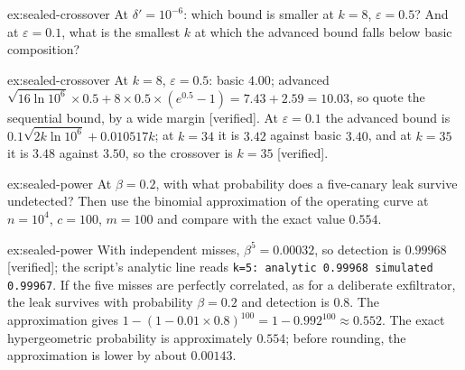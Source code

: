 \documentclass[11pt,a4paper]{article}
\theoremstyle{definition}
\begin{document}
\begin{pdexercise}[kind=Check,rating=1]{ex:sealed-crossover}
At $\delta'=10^{-6}$: which bound is smaller at $k=8$, $\varepsilon=0.5$? And at
$\varepsilon=0.1$, what is the smallest $k$ at which the advanced bound falls
below basic composition?
\end{pdexercise}
\begin{pdsolution}{ex:sealed-crossover}
At $k=8$, $\varepsilon=0.5$: basic $4.00$; advanced
$\sqrt{16\ln 10^{6}}\times0.5+8\times0.5\times(e^{0.5}-1)=7.43+2.59=10.03$,
so quote the sequential bound, by a wide margin [verified]. At
$\varepsilon=0.1$ the advanced bound is
$0.1\sqrt{2k\ln 10^{6}}+0.010517k$; at $k=34$ it is $3.42$ against basic
$3.40$, and at $k=35$ it is $3.48$ against $3.50$, so the crossover is $k=35$
[verified].
\end{pdsolution}




\begin{pdexercise}[kind=Check,rating=1]{ex:sealed-power}
At $\beta=0.2$, with what probability does a five-canary leak survive
undetected? Then use the binomial approximation of the operating curve at
$n=10^4$, $c=100$, $m=100$ and compare with the exact value $0.554$.
\end{pdexercise}
\begin{pdsolution}{ex:sealed-power}
With independent misses, $\beta^5=0.00032$, so detection is $0.99968$
[verified]; the script's analytic line reads
\texttt{k=5: analytic 0.99968 simulated 0.99967}. If the five misses are
perfectly correlated, as for a deliberate exfiltrator, the leak survives with
probability $\beta=0.2$ and detection is $0.8$. The approximation
gives $1-(1-0.01\times0.8)^{100}=1-0.992^{100}\approx0.552$.
The exact hypergeometric probability is approximately $0.554$; before rounding,
the approximation is lower by about $0.00143$.
\end{pdsolution}
\end{document}
